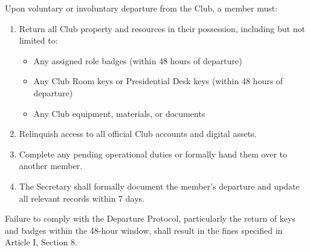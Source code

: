 Upon voluntary or involuntary departure from the Club, a member must:
\begin{enumerate}[label=\alph*), leftmargin=2em, itemsep=0.3em]
    \item Return all Club property and resources in their possession, including but not limited to:
    \begin{itemize}[leftmargin=1.5em, itemsep=0.2em]
        \item Any assigned role badges (within 48 hours of departure)
        \item Any Club Room keys or Presidential Desk keys (within 48 hours of departure)
        \item Any Club equipment, materials, or documents
    \end{itemize}
    \item Relinquish access to all official Club accounts and digital assets.
    \item Complete any pending operational duties or formally hand them over to another member.
    \item The Secretary shall formally document the member's departure and update all relevant records within 7 days.
\end{enumerate}

Failure to comply with the Departure Protocol, particularly the return of keys and badges within the 48-hour window, shall result in the fines specified in Article I, Section 8.
